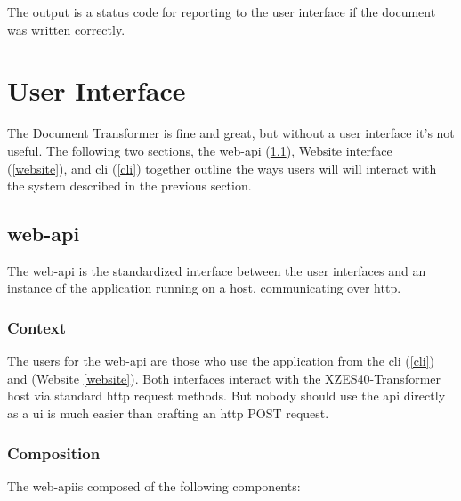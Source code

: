 The output is a status code for reporting to the user interface if the document was written correctly.

\section{User Interface}
\label{user-interface}

The Document Transformer is fine and great, but without a user interface it's not useful.
The following two sections, the \gls{web-api} (\ref{web-api}), Website interface (\ref{website}), and \gls{cli} (\ref{cli}) together outline the ways users will will interact with the system described in the previous section.

\subsection{\gls{web-api}}
\label{web-api}

The \gls{web-api} is the standardized interface between the user interfaces and an instance of the application running on a host, communicating over \gls{http}.

\subsubsection{Context}

The users for the \gls{web-api} are those who use the application from the \gls{cli} (\ref{cli}) and (Website \ref{website}).
Both interfaces interact with the XZES40-Transformer host via standard \gls{http} request methods.
But nobody should use the \gls{api} directly as a \gls{ui} is much easier than crafting an \gls{http} POST request.

\subsubsection{Composition}

The \gls{web-api}is composed of the following components:


